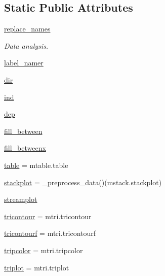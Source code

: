 \subsection*{Static Public Attributes}
\begin{DoxyCompactItemize}
\item 
\hyperlink{classmatplotlib_1_1axes_1_1__axes_1_1Axes_a2e56fa58da13e40bb4b681d6a5ed6cec}{replace\+\_\+names}
\begin{DoxyCompactList}\small\item\em Data analysis. \end{DoxyCompactList}\item 
\hyperlink{classmatplotlib_1_1axes_1_1__axes_1_1Axes_ac16ab99ee1d6d2b77c35fa265335d49b}{label\+\_\+namer}
\item 
\hyperlink{classmatplotlib_1_1axes_1_1__axes_1_1Axes_a10c7f458f94569ad7ba7dc36b49d2b89}{dir}
\item 
\hyperlink{classmatplotlib_1_1axes_1_1__axes_1_1Axes_ac86c95200674fc56fc4810492e8343ca}{ind}
\item 
\hyperlink{classmatplotlib_1_1axes_1_1__axes_1_1Axes_ac1a8a79147213ff0727f37caa19c32a8}{dep}
\item 
\hyperlink{classmatplotlib_1_1axes_1_1__axes_1_1Axes_a3adc72fa7469a0f49a7667c62cc8ccb0}{fill\+\_\+between}
\item 
\hyperlink{classmatplotlib_1_1axes_1_1__axes_1_1Axes_a24ab86875fb636058536616aed268124}{fill\+\_\+betweenx}
\item 
\hyperlink{classmatplotlib_1_1axes_1_1__axes_1_1Axes_a645dfc69e7bedadad758557b113bec01}{table} = mtable.\+table
\item 
\hyperlink{classmatplotlib_1_1axes_1_1__axes_1_1Axes_a2dfbda65ad3d685153b649f309a62e13}{stackplot} = \+\_\+preprocess\+\_\+data()(mstack.\+stackplot)
\item 
\hyperlink{classmatplotlib_1_1axes_1_1__axes_1_1Axes_ad3e395186593e05c34acb606a22cc9cb}{streamplot}
\item 
\hyperlink{classmatplotlib_1_1axes_1_1__axes_1_1Axes_a50615ea338c80005e46d5521bcc5cc1a}{tricontour} = mtri.\+tricontour
\item 
\hyperlink{classmatplotlib_1_1axes_1_1__axes_1_1Axes_aaefaf75d6f98b5fe75bd487a7133fc98}{tricontourf} = mtri.\+tricontourf
\item 
\hyperlink{classmatplotlib_1_1axes_1_1__axes_1_1Axes_a0df6bb4f5b90855060cf5ebe371ecabf}{tripcolor} = mtri.\+tripcolor
\item 
\hyperlink{classmatplotlib_1_1axes_1_1__axes_1_1Axes_a998f6f6d8a350bd3fc7997cbeaeaf098}{triplot} = mtri.\+triplot
\end{DoxyCompactItemize}



